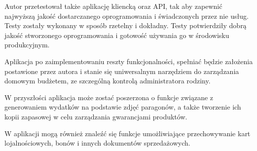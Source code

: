 Autor przetestował także aplikację kliencką oraz API, tak aby zapewnić najwyższą jakość dostarczanego oprogramowania i świadczonych przez nie usług. Testy zostały wykonany w sposób rzetelny i dokładny. Testy potwierdziły dobrą jakość stworzonego oprogramowania i gotowość używania go w środowisku produkcyjnym.

Aplikacja po zaimplementowaniu reszty funkcjonalności, spełniać będzie założenia postawione przez autora i stanie się uniwersalnym narzędziem do zarządzania domowym budżetem, ze szczególną kontrolą administratora rodziny.

W przyszłości aplikacja może zostać poszerzona o funkcje związane z generowaniem wydatków na podstawie zdjęć paragonów, a także tworzenie ich kopii zapasowej w celu zarządzania gwarancjami produktów.

W aplikacji mogą również znaleźć się funkcje umożliwiające przechowywanie kart lojalnościowych, bonów i innych dokumentów sprzedażowych.